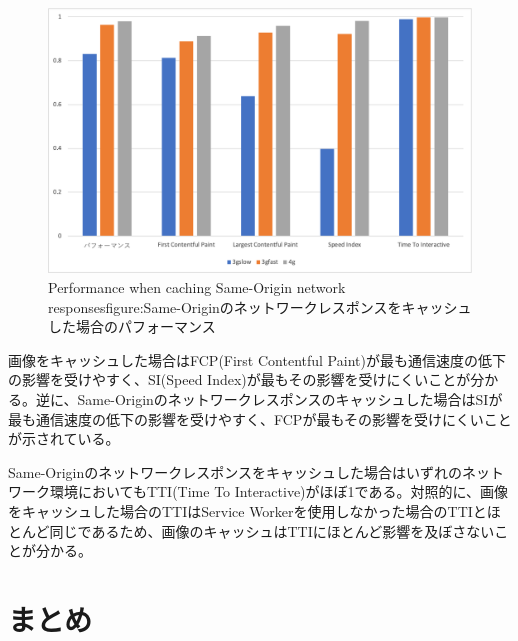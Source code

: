 \begin{multicols*}{2}
\begin{figure}
\end{figure}
\begin{figure}
  \centering
  \includegraphics[width=\textwidth]{images/service_worker_cache_same_origin.png}
  {Performance when caching Same-Origin network responses}{figure:Same-Originのネットワークレスポンスをキャッシュした場合のパフォーマンス}
\end{figure}
画像をキャッシュした場合はFCP(First Contentful Paint)が最も通信速度の低下の影響を受けやすく、SI(Speed Index)が最もその影響を受けにくいことが分かる。逆に、Same-Originのネットワークレスポンスのキャッシュした場合はSIが最も通信速度の低下の影響を受けやすく、FCPが最もその影響を受けにくいことが示されている。

Same-Originのネットワークレスポンスをキャッシュした場合はいずれのネットワーク環境においてもTTI(Time To Interactive)がほぼ1である。対照的に、画像をキャッシュした場合のTTIはService Workerを使用しなかった場合のTTIとほとんど同じであるため、画像のキャッシュはTTIにほとんど影響を及ぼさないことが分かる。

\section{まとめ}

\end{multicols*}
